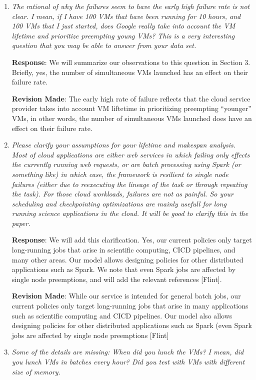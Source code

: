 \documentclass{article}
\newcommand{\resp}[1]{\textbf{Response}: #1}
\newcommand{\revmade}[1]{\textbf{Revision Made}: #1}
\begin{document}
\begin{enumerate}

\item \emph{The rational of why the failures seem to have the early high failure rate is not clear. I mean, if I have 100 VMs that have been running for 10 hours, and 100 VMs that I just started, does Google really take into account the VM lifetime and prioritize preempting young VMs? This is a very interesting question that you may be able to answer from your data set.}

\resp{We will summarize our observations to this question in Section 3. Briefly, yes, the number of simultaneous VMs launched has an effect on their failure rate.}

\revmade{The early high rate of failure reflects that the cloud service provider takes into account VM liftetime in prioritizing preempting ``younger'' VMs, in other words, the number of simultaneous VMs launched does have an effect on their failure rate.}


\item \emph{Please clarify your assumptions for your lifetime and makespan analysis. Most of cloud applications are either web services in which failing only effects the currently running web requests, or are batch processing using Spark (or something like) in which case, the framework is resilient to single node failures (either due to reexecuting the lineage of the task or through repeating the task). For those cloud workloads, failures are not as painful. So your scheduling and checkpointing optimizations are mainly usefull for long running science applications in the cloud. It will be good to clarify this in the paper.}

\resp{We will add this clarification. Yes, our current policies only target long-running jobs that arise in scientific computing, CICD pipelines, and many other areas. Our model allows designing policies for other distributed applications such as Spark. We note that even Spark jobs are affected by single node preemptions, and will add the relevant references [Flint]}.

\revmade{While our service is intended for general batch jobs, our current policies only target long-running jobs that arise in many applications such as scientific computing and CICD pipelines. Our model also allows designing policies for other distributed applications such as Spark (even Spark jobs are affected by single node preemptions [Flint]}

\item \emph{Some of the details are missing: When did you lunch the VMs? I mean, did you lunch VMs in batches every hour? Did you test with VMs with different size of memory.}


\end{enumerate}
\end{document}
